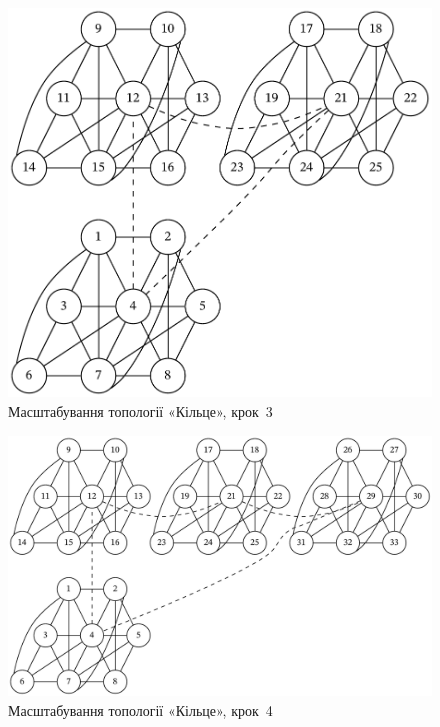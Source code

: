 \documentclass[
	a4paper,
	oneside,
	BCOR = 10mm,
	DIV = 12,
	12pt,
	headings = normal,
]{scrartcl}
\begin{document}
				\begin{figure}[!htbp]
					\centering
					\includegraphics[height=12\baselineskip]{./assets/cluster-08-04-ring-s03.pdf}
					\caption{Масштабування топології «Кільце», крок~3}
					\label{fig:cluster-08-04-ring-s03}
				\end{figure}

				\begin{figure}[!htbp]
					\centering
					\includegraphics[height=12\baselineskip]{./assets/cluster-08-04-ring-s04.pdf}
					\caption{Масштабування топології «Кільце», крок~4}
					\label{fig:cluster-08-04-ring-s04}
				\end{figure}
\end{document}
